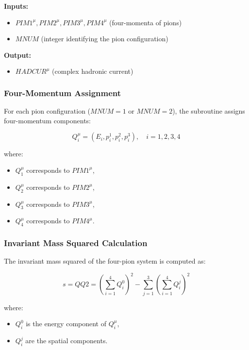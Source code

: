 \documentclass[12pt]{article}
\begin{document}
\textbf{Inputs:}
\begin{itemize}
    \item \( PIM1^\mu, PIM2^\mu, PIM3^\mu, PIM4^\mu \) (four-momenta of pions)
    \item \( MNUM \) (integer identifying the pion configuration)
\end{itemize}

\textbf{Output:}
\begin{itemize}
    \item \( HADCUR^\mu \) (complex hadronic current)
\end{itemize}

\subsubsection{Four-Momentum Assignment}

For each pion configuration (\( MNUM = 1 \) or \( MNUM = 2 \)), the subroutine assigns four-momentum components:

\begin{equation}
    Q_i^\mu = (E_i, p_i^1, p_i^2, p_i^3), \quad i = 1,2,3,4
\end{equation}

where:
\begin{itemize}
    \item \( Q_1^\mu \) corresponds to \( PIM1^\mu \),
    \item \( Q_2^\mu \) corresponds to \( PIM2^\mu \),
    \item \( Q_3^\mu \) corresponds to \( PIM3^\mu \),
    \item \( Q_4^\mu \) corresponds to \( PIM4^\mu \).
\end{itemize}

\subsubsection{Invariant Mass Squared Calculation}

The invariant mass squared of the four-pion system is computed as:

\begin{equation}
    s = QQ2 = \left( \sum_{i=1}^{4} Q_i^0 \right)^2 - \sum_{j=1}^{3} \left( \sum_{i=1}^{4} Q_i^j \right)^2
\end{equation}

where:
\begin{itemize}
    \item \( Q_i^0 \) is the energy component of \( Q_i^\mu \),
    \item \( Q_i^j \) are the spatial components.
\end{itemize}
\end{document}
